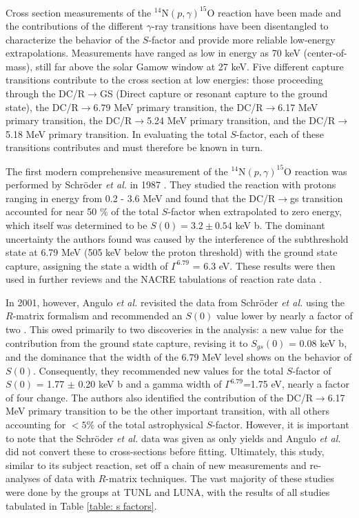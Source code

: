 Cross section measurements of the $^{14}$N$\left( p,\gamma \right) ^{15}$O reaction have been made and the contributions of the different $\gamma$-ray transitions have been disentangled to characterize the behavior of the $S$-factor  and provide more reliable low-energy extrapolations. Measurements have ranged as low in energy as 70 keV (center-of-mass), still far above the solar Gamow window at 27 keV. Five different capture transitions contribute to the cross section at low energies: those proceeding through the DC/R$\rightarrow$GS (Direct capture or resonant capture to the ground state), the DC/R$\rightarrow$6.79 MeV primary transition, the DC/R$\rightarrow$6.17 MeV primary transition, the DC/R$\rightarrow$5.24 MeV primary transition, and the DC/R$\rightarrow$5.18 MeV primary transition. In evaluating the total $S$-factor, each of these transitions contributes and must therefore be known in turn. 

The first modern comprehensive measurement of the $^{14}$N$\left( p,\gamma \right) ^{15}$O reaction was performed by Schr{\"o}der \textit{et al.} in 1987 \cite{Schroder1987}. They studied the reaction with protons ranging in energy from 0.2 - 3.6 MeV and found that the DC/R$\rightarrow$gs transition accounted for near 50 \% of the total $S$-factor when extrapolated to zero energy, which itself was determined to be $S(0) = 3.2 \pm 0.54$ keV b. The dominant uncertainty the authors found was caused by the interference of the subthreshold state at 6.79 MeV (505 keV below the proton threshold) with the ground state capture, assigning the state a width of $\Gamma^{6.79}$ = 6.3 eV. These results were then used in further reviews \cite{Adelberger1998} and the NACRE tabulations of reaction rate data \cite{Angulo1999}. 

In 2001, however, Angulo \textit{et al.} revisited the data from Schr{\"o}der \textit{et al.} \cite{Schroder1987} using the $R$-matrix formalism and recommended an $S(0)$ value lower by nearly a factor of two \cite{Angulo2001}. This owed primarily to two discoveries in the analysis: a new value for the contribution from the ground state capture, revising it to $S_{gs}(0)$ = 0.08 keV b, and the dominance that the width of the 6.79 MeV level shows on the behavior of $S(0)$. Consequently, they recommended new values for the total $S$-factor of $S(0)$ = 1.77 $\pm$ 0.20 keV b and a gamma width of $\Gamma^{6.79}$=1.75 eV, nearly a factor of four change. The authors also identified the contribution of the DC/R$\rightarrow$6.17 MeV primary transition to be the other important transition, with all others accounting for $< 5\%$ of the total astrophysical $S$-factor. However, it is important to note that the Schr{\"o}der \textit{et al.} \cite{Schroder1987} data was given as only yields and Angulo \textit{et al.} \cite{Angulo2001} did not convert these to cross-sections before fitting. Ultimately, this study, similar to its subject reaction, set off a chain of new measurements and re-analyses of data with $R$-matrix techniques. The vast majority of these studies were done by the groups at TUNL and LUNA, with the results of all studies tabulated in Table \ref{table: s factors}.

